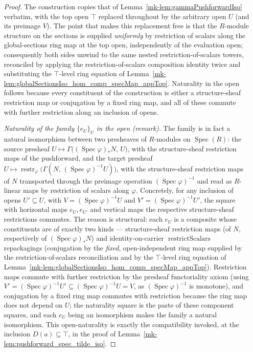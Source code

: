 \begin{proof}
  \leanok
  The construction copies that of Lemma~\ref{mk-lem:gammaPushforwardIso} verbatim,
  with the top open \(\top\) replaced throughout by the arbitrary open \(U\) (and
  its preimage \(V\)). The point that makes this replacement free is that the
  \(R\)-module structure on the sections is supplied \emph{uniformly} by
  restriction of scalars along the global-sections ring map at the top open,
  independently of the evaluation open; consequently both sides unwind to the same
  nested restriction-of-scalars towers, reconciled by applying the
  restriction-of-scalars composition identity twice and substituting the
  \(\top\)-level ring equation of
  Lemma~\ref{mk-lem:globalSectionsIso_hom_comp_specMap_appTop}. Naturality in the open
  follows because every constituent of the construction is either a structure-sheaf
  restriction map or conjugation by a fixed ring map, and all of these commute with
  further restriction along an inclusion of opens.

  \medskip
  \emph{Naturality of the family \(\{e_U\}_U\) in the open (remark).} The family is
  in fact a natural isomorphism between two presheaves of \(R\)-modules on
  \(\operatorname{Spec}(R)\): the source presheaf
  \(U \mapsto \Gamma\bigl((\operatorname{Spec}\varphi)_* N,\, U\bigr)\), with the
  structure-sheaf restriction maps of the pushforward, and the target presheaf
  \(U \mapsto
    \operatorname{restr}_\varphi\bigl(\Gamma(N,\, (\operatorname{Spec}\varphi)^{-1}U)\bigr)\),
  with the structure-sheaf restriction maps of \(N\) transported through the preimage
  operation \((\operatorname{Spec}\varphi)^{-1}\) and read as \(R\)-linear maps by
  restriction of scalars along \(\varphi\). Concretely, for any inclusion of opens
  \(U' \subseteq U\), with \(V = (\operatorname{Spec}\varphi)^{-1}U\) and
  \(V' = (\operatorname{Spec}\varphi)^{-1}U'\), the square with horizontal maps
  \(e_U, e_{U'}\) and vertical maps the respective structure-sheaf restrictions
  commutes. The reason is structural: each \(e_U\) is a composite whose constituents
  are of exactly two kinds — structure-sheaf restriction maps (of \(N\),
  respectively of \((\operatorname{Spec}\varphi)_* N\)) and identity-on-carrier
  \(\operatorname{restrictScalars}\) repackagings (conjugation by the \emph{fixed},
  open-independent ring map supplied by the restriction-of-scalars reconciliation and
  by the \(\top\)-level ring equation of
  Lemma~\ref{mk-lem:globalSectionsIso_hom_comp_specMap_appTop}). Restriction maps commute
  with further restriction by the presheaf functoriality axiom (using
  \(V' = (\operatorname{Spec}\varphi)^{-1}U' \subseteq
  (\operatorname{Spec}\varphi)^{-1}U = V\), as \((\operatorname{Spec}\varphi)^{-1}\) is
  monotone), and conjugation by a fixed ring map commutes with restriction because the
  ring map does not depend on \(U\); the naturality square is the paste of these
  component squares, and each \(e_U\) being an isomorphism makes the family a natural
  isomorphism. This open-naturality is exactly the compatibility invoked, at the
  inclusion \(D(a) \subseteq \top\), in the proof of
  Lemma~\ref{mk-lem:pushforward_spec_tilde_iso}.
\end{proof}

